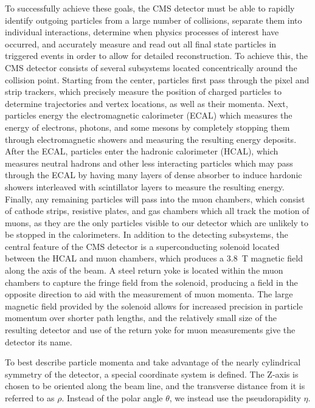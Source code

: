 To successfully achieve these goals, the CMS detector must be able to rapidly identify outgoing particles from a large number of collisions, separate them into individual interactions, determine when physics processes of interest have occurred, and accurately measure and read out all final state particles in triggered events in order to allow for detailed reconstruction. 
To achieve this, the CMS detector consists of several subsystems located concentrically around the collision point. 
Starting from the center, particles first pass through the pixel and strip trackers, which precisely measure the position of charged particles to determine trajectories and vertex locations, as well as their momenta.
Next, particles energy the electromagnetic calorimeter (ECAL) which measures the energy of electrons, photons, and some mesons by completely stopping them through electromagnetic showers and measuring the resulting energy deposits.
After the ECAL, particles enter the hadronic calorimeter (HCAL), which measures neutral hadrons and other less interacting particles which may pass through the ECAL by having many layers of dense absorber to induce hardonic showers interleaved with scintillator layers to measure the resulting energy.
Finally, any remaining particles will pass into the muon chambers, which consist of cathode strips, resistive plates, and gas chambers which all track the motion of muons, as they are the only particles visible to our detector which are unlikely to be stopped in the calorimeters.
In addition to the detecting subsystems, the central feature of the CMS detector is a superconducting solenoid located between the HCAL and muon chambers, which produces a \SI{3.8}{\tesla} magnetic field along the axis of the beam. 
A steel return yoke is located within the muon chambers to capture the fringe field from the solenoid, producing a field in the opposite direction to aid with the measurement of muon momenta.
The large magnetic field provided by the solenoid allows for increased precision in particle momentum over shorter path lengths, and the relatively small size of the resulting detector and use of the return yoke for muon measurements give the detector its name.

To best describe particle momenta and take advantage of the nearly cylindrical symmetry of the detector, a special coordinate system is defined. 
The Z-axis is chosen to be oriented along the beam line, and the transverse distance from it is referred to as $\rho$. 
Instead of the polar angle $\theta$, we instead use the pseudorapidity $\eta$. 


